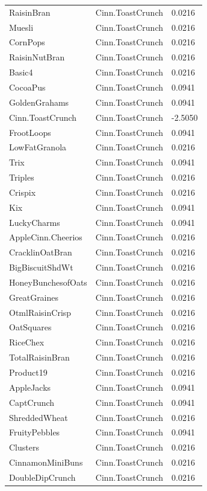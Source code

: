 \begin{table}[!htbp]
\begin{tabular}{lll}
RaisinBran & Cinn.ToastCrunch & 0.0216
\\
Muesli & Cinn.ToastCrunch & 0.0216
\\
CornPops & Cinn.ToastCrunch & 0.0216
\\
RaisinNutBran & Cinn.ToastCrunch & 0.0216
\\
Basic4 & Cinn.ToastCrunch & 0.0216
\\
CocoaPus & Cinn.ToastCrunch & 0.0941
\\
GoldenGrahams & Cinn.ToastCrunch & 0.0941
\\
Cinn.ToastCrunch & Cinn.ToastCrunch & -2.5050
\\
FrootLoops & Cinn.ToastCrunch & 0.0941
\\
LowFatGranola & Cinn.ToastCrunch & 0.0216
\\
Trix & Cinn.ToastCrunch & 0.0941
\\
Triples & Cinn.ToastCrunch & 0.0216
\\
Crispix & Cinn.ToastCrunch & 0.0216
\\
Kix & Cinn.ToastCrunch & 0.0941
\\
LuckyCharms & Cinn.ToastCrunch & 0.0941
\\
AppleCinn.Cheerios & Cinn.ToastCrunch & 0.0216
\\
CracklinOatBran & Cinn.ToastCrunch & 0.0216
\\
BigBiscuitShdWt & Cinn.ToastCrunch & 0.0216
\\
HoneyBunchesofOats & Cinn.ToastCrunch & 0.0216
\\
GreatGraines & Cinn.ToastCrunch & 0.0216
\\
OtmlRaisinCrisp & Cinn.ToastCrunch & 0.0216
\\
OatSquares & Cinn.ToastCrunch & 0.0216
\\
RiceChex & Cinn.ToastCrunch & 0.0216
\\
TotalRaisinBran & Cinn.ToastCrunch & 0.0216
\\
Product19 & Cinn.ToastCrunch & 0.0216
\\
AppleJacks & Cinn.ToastCrunch & 0.0941
\\
CaptCrunch & Cinn.ToastCrunch & 0.0941
\\
ShreddedWheat & Cinn.ToastCrunch & 0.0216
\\
FruityPebbles & Cinn.ToastCrunch & 0.0941
\\
Clusters & Cinn.ToastCrunch & 0.0216
\\
CinnamonMiniBuns & Cinn.ToastCrunch & 0.0216
\\
DoubleDipCrunch & Cinn.ToastCrunch & 0.0216

\end{tabular}
\end{table}
